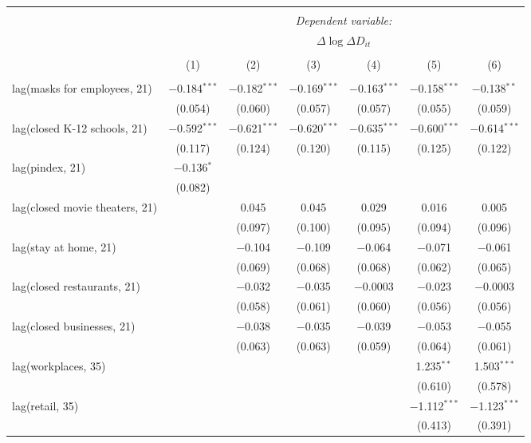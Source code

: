 \begin{tabular}{@{\extracolsep{1pt}}lcccccc} 
\\[-1.8ex]\hline 
\hline \\[-1.8ex] 
 & \multicolumn{6}{c}{\textit{Dependent variable:}} \\ 
\cline{2-7} 
 & \multicolumn{6}{c}{$\Delta \log \Delta D_{it}$} \\ 
\\[-1.8ex] & (1) & (2) & (3) & (4) & (5) & (6)\\ 
\hline \\[-1.8ex] 
 lag(masks for employees, 21) & $-$0.184$^{***}$ & $-$0.182$^{***}$ & $-$0.169$^{***}$ & $-$0.163$^{***}$ & $-$0.158$^{***}$ & $-$0.138$^{**}$ \\ 
  & (0.054) & (0.060) & (0.057) & (0.057) & (0.055) & (0.059) \\ 
  lag(closed K-12 schools, 21) & $-$0.592$^{***}$ & $-$0.621$^{***}$ & $-$0.620$^{***}$ & $-$0.635$^{***}$ & $-$0.600$^{***}$ & $-$0.614$^{***}$ \\ 
  & (0.117) & (0.124) & (0.120) & (0.115) & (0.125) & (0.122) \\ 
  lag(pindex, 21) & $-$0.136$^{*}$ &  &  &  &  &  \\ 
  & (0.082) &  &  &  &  &  \\ 
  lag(closed movie theaters, 21) &  & 0.045 & 0.045 & 0.029 & 0.016 & 0.005 \\ 
  &  & (0.097) & (0.100) & (0.095) & (0.094) & (0.096) \\ 
  lag(stay at home, 21) &  & $-$0.104 & $-$0.109 & $-$0.064 & $-$0.071 & $-$0.061 \\ 
  &  & (0.069) & (0.068) & (0.068) & (0.062) & (0.065) \\ 
  lag(closed restaurants, 21) &  & $-$0.032 & $-$0.035 & $-$0.0003 & $-$0.023 & $-$0.0003 \\ 
  &  & (0.058) & (0.061) & (0.060) & (0.056) & (0.056) \\ 
  lag(closed businesses, 21) &  & $-$0.038 & $-$0.035 & $-$0.039 & $-$0.053 & $-$0.055 \\ 
  &  & (0.063) & (0.063) & (0.059) & (0.064) & (0.061) \\ 
  lag(workplaces, 35) &  &  &  &  & 1.235$^{**}$ & 1.503$^{***}$ \\ 
  &  &  &  &  & (0.610) & (0.578) \\ 
  lag(retail, 35) &  &  &  &  & $-$1.112$^{***}$ & $-$1.123$^{***}$ \\ 
  &  &  &  &  & (0.413) & (0.391) \\ 

\end{tabular}
